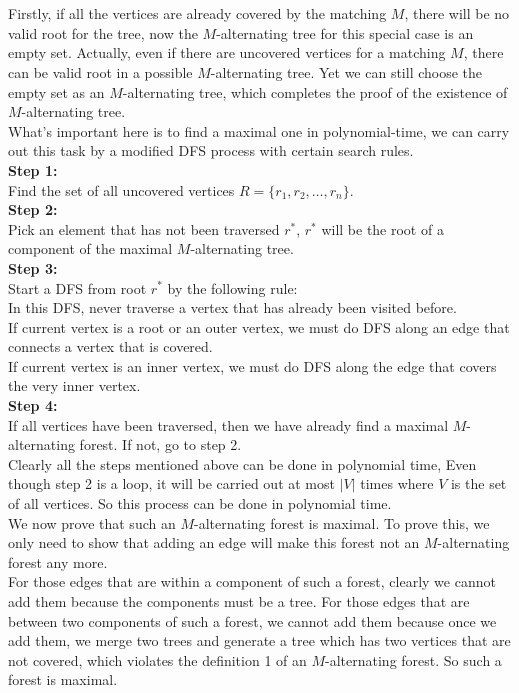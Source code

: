 \documentclass[12pt,letterpaper]{article}
\begin{document}
\newpage
\section{}
Firstly, if all the vertices are already covered by the matching $M$,
there will be no valid root for the tree,
now the $M$-alternating tree for this special case is an empty set.
Actually, even if there are uncovered vertices for a matching $M$,
there can be valid root in a possible $M$-alternating tree.
Yet we can still choose the empty set as an $M$-alternating tree,
which completes the proof of the existence of $M$-alternating tree.\\
What's important here is to find a maximal one in polynomial-time,
we can carry out this task by a modified DFS process with certain search rules.\\
\textbf{Step 1:}\\
Find the set of all uncovered vertices $R=\{r_1,r_2,\dots,r_n\}$.\\
\textbf{Step 2:}\\
Pick an element that has not been traversed $r^*$,
$r^*$ will be the root of a component of the maximal $M$-alternating tree.\\
\textbf{Step 3:}\\
Start a DFS from root $r^*$ by the following rule:\\
In this DFS, never traverse a vertex that has already been visited before.\\
If current vertex is a root or an outer vertex,
we must do DFS along an edge that connects a vertex that is covered.\\
If current vertex is an inner vertex,
we must do DFS along the edge that covers the very inner vertex.\\
\textbf{Step 4:}\\
If all vertices have been traversed, 
then we have already find a maximal $M$-alternating forest.
If not, go to step 2.\\
Clearly all the steps mentioned above can be done in polynomial time,
Even though step 2 is a loop,
it will be carried out at most $|V|$ times where $V$ is the set of all vertices.
So this process can be done in polynomial time.\\
We now prove that such an $M$-alternating forest is maximal. 
To prove this, 
we only need to show that adding an edge will make this forest not an 
$M$-alternating forest any more.\\
For those edges that are within a component of such a forest,
clearly we cannot add them because the components must be a tree.
For those edges that are between two components of such a forest,
we cannot add them because once we add them, 
we merge two trees and generate a tree which has two vertices that are not covered,
which violates the definition 1 of an $M$-alternating forest.
So such a forest is maximal.
\end{document}
